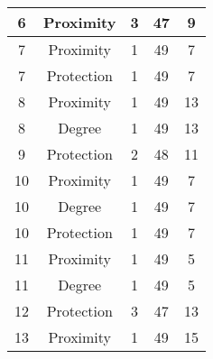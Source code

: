\documentclass[results.tex]{subfiles}
\begin{document}
\begin{center}
\begin{tabular}{| c || c | c | c | c |}
            \hline
            6                       & Proximity                    & 3                      & 47                      & 9                    \\
            \hline
            7                       & Proximity                    & 1                      & 49                      & 7                    \\
            \hline
            7                       & Protection                   & 1                      & 49                      & 7                    \\
            \hline
            8                       & Proximity                    & 1                      & 49                      & 13                   \\
            \hline
            8                       & Degree                       & 1                      & 49                      & 13                   \\
            \hline
            9                       & Protection                   & 2                      & 48                      & 11                   \\
            \hline
            10                      & Proximity                    & 1                      & 49                      & 7                    \\
            \hline
            10                      & Degree                       & 1                      & 49                      & 7                    \\
            \hline
            10                      & Protection                   & 1                      & 49                      & 7                    \\
            \hline
            11                      & Proximity                    & 1                      & 49                      & 5                    \\
            \hline
            11                      & Degree                       & 1                      & 49                      & 5                    \\
            \hline
            12                      & Protection                   & 3                      & 47                      & 13                   \\
            \hline
            13                      & Proximity                    & 1                      & 49                      & 15                   \\

\end{tabular}
\end{center}
\end{document}
